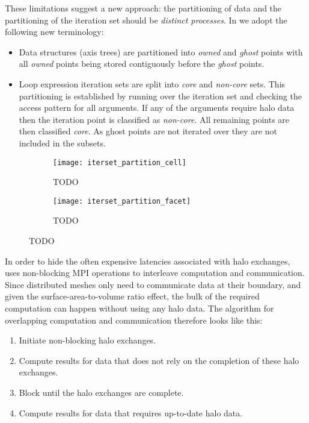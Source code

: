 \documentclass[thesis]{subfiles}
\begin{document}
These limitations suggest a new approach: the partitioning of data and the partitioning of the iteration set should be \textit{distinct processes}.
In  we adopt the following new terminology:

\begin{itemize}
  \item
    Data structures (axis trees) are partitioned into \textit{owned} and \textit{ghost} points with all \textit{owned} points being stored contiguously before the \textit{ghost} points.

  \item
    Loop expression iteration sets are split into \textit{core} and \textit{non-core} sets.
    This partitioning is established by running over the iteration set and checking the access pattern for all arguments.
    If any of the arguments require halo data then the iteration point is classified as \textit{non-core}.
    All remaining points are then classified \textit{core}.
    As ghost points are not iterated over they are not included in the subsets.
\end{itemize}


\begin{figure}
  \begin{subfigure}{\textwidth}
    \texttt{[image: iterset\_partition\_cell]}
    \caption{TODO}
    \label{fig:iterset_partition_cell}
  \end{subfigure}
  \begin{subfigure}{\textwidth}
    \texttt{[image: iterset\_partition\_facet]}
    \caption{TODO}
    \label{fig:iterset_partition_facet}
  \end{subfigure}
  \caption{TODO}
  \label{fig:iterset_partition}
\end{figure}

In order to hide the often expensive latencies associated with halo exchanges,  uses non-blocking MPI operations to interleave computation and communication.
Since distributed meshes only need to communicate data at their boundary, and given the surface-area-to-volume ratio effect, the bulk of the required computation can happen without using any halo data.
The algorithm for overlapping computation and communication therefore looks like this:

\begin{enumerate}
  \item Initiate non-blocking halo exchanges.
  \item Compute results for data that does not rely on the completion of these halo exchanges.
  \item Block until the halo exchanges are complete.
  \item Compute results for data that requires up-to-date halo data.
\end{enumerate}
\end{document}
